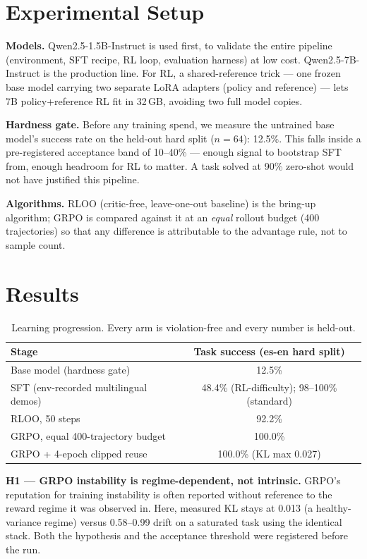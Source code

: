 \documentclass[11pt]{article}
\begin{document}
\section{Experimental Setup}
\textbf{Models.} Qwen2.5-1.5B-Instruct is used first, to validate the entire
pipeline (environment, SFT recipe, RL loop, evaluation harness) at low cost.
Qwen2.5-7B-Instruct is the production line. For RL, a shared-reference trick ---
one frozen base model carrying two separate LoRA adapters (policy and reference)
--- lets 7B policy+reference RL fit in 32\,GB, avoiding two full model copies.

\textbf{Hardness gate.} Before any training spend, we measure the untrained base
model's success rate on the held-out hard split ($n{=}64$): 12.5\%. This falls
inside a pre-registered acceptance band of 10--40\% --- enough signal to
bootstrap SFT from, enough headroom for RL to matter. A task solved at 90\%
zero-shot would not have justified this pipeline.

\textbf{Algorithms.} RLOO (critic-free, leave-one-out baseline) is the bring-up
algorithm; GRPO is compared against it at an \emph{equal} rollout budget (400
trajectories) so that any difference is attributable to the advantage rule, not
to sample count.

\section{Results}
\begin{table}[h]
\centering
\begin{tabular}{lc}
\toprule
\textbf{Stage} & \textbf{Task success (es-en hard split)} \\
\midrule
Base model (hardness gate) & 12.5\% \\
SFT (env-recorded multilingual demos) & 48.4\% (RL-difficulty); 98--100\% (standard) \\
RLOO, 50 steps & 92.2\% \\
GRPO, equal 400-trajectory budget & 100.0\% \\
GRPO + 4-epoch clipped reuse & 100.0\% (KL max 0.027) \\
\bottomrule
\end{tabular}
\caption{Learning progression. Every arm is violation-free and every number is
held-out.}
\end{table}

\textbf{H1 --- GRPO instability is regime-dependent, not intrinsic.} GRPO's
reputation for training instability is often reported without reference to the
reward regime it was observed in. Here, measured KL stays at 0.013 (a
healthy-variance regime) versus 0.58--0.99 drift on a saturated task using the
identical stack. Both the hypothesis and the acceptance threshold were registered
before the run.
\end{document}
